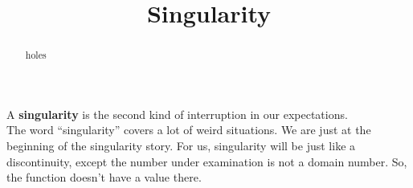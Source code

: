 \documentclass{ximera}
\title{Singularity}
\begin{document}
\begin{abstract}
holes
\end{abstract}
\maketitle











A \textbf{singularity} is the second kind of interruption in our expectations. \\

The word ``singularity'' covers a lot of weird situations.  We are just at the beginning of the singularity story.  For us, singularity will be just like a discontinuity, except the number under examination is not a domain number.  So, the function doesn't have a value there.
\end{document}
